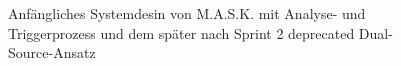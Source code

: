 \FloatBarrier
\begin{figure}[htbp]
    \centering
    \caption{Anfängliches Systemdesin von M.A.S.K. mit Analyse- und Triggerprozess und dem später nach Sprint 2 deprecated Dual-Source-Ansatz}
    \label{fig:mask_architecture}
\end{figure}

